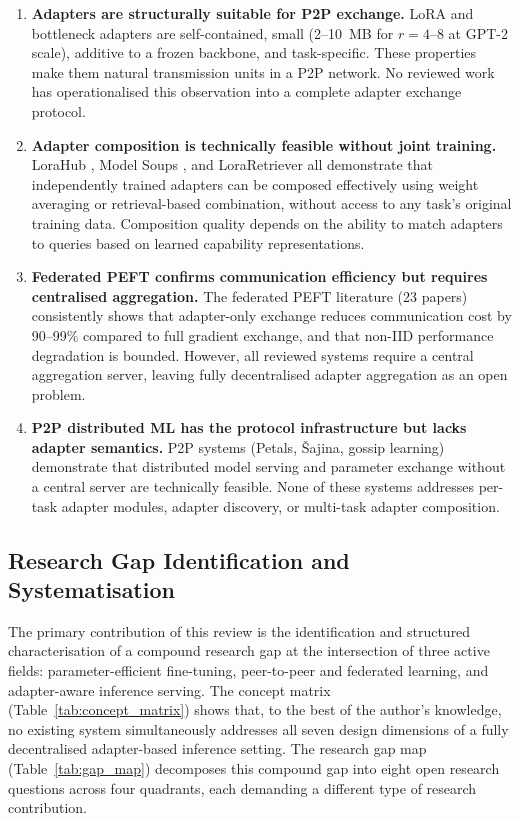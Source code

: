 \begin{enumerate}
  \item \textbf{Adapters are structurally suitable for P2P exchange.} LoRA and
    bottleneck adapters are self-contained, small (2--10~MB for $r = 4$--$8$ at
    GPT-2 scale), additive to a frozen backbone, and task-specific. These properties
    make them natural transmission units in a P2P network. No reviewed work has operationalised this observation into a complete adapter exchange protocol.

  \item \textbf{Adapter composition is technically feasible without joint training.}
    LoraHub \citep{Huang2023}, Model Soups \citep{Wortsman2022}, and
    LoraRetriever \citep{ZhaoLoraRetriever2024} all demonstrate that independently
    trained adapters can be composed effectively using weight averaging or retrieval-based
    combination, without access to any task's original training data. Composition quality
    depends on the ability to match adapters to queries based on learned capability
    representations.

  \item \textbf{Federated PEFT confirms communication efficiency but requires
    centralised aggregation.} The federated PEFT literature (23 papers) consistently
    shows that adapter-only exchange reduces communication cost by 90--99\% compared
    to full gradient exchange, and that non-IID performance degradation is bounded.
    However, all reviewed systems require a central aggregation server, leaving fully
    decentralised adapter aggregation as an open problem.

  \item \textbf{P2P distributed ML has the protocol infrastructure but lacks adapter
    semantics.} P2P systems (Petals, Šajina, gossip learning) demonstrate that
    distributed model serving and parameter exchange without a central server are
    technically feasible. None of these systems addresses per-task adapter modules,
    adapter discovery, or multi-task adapter composition.
\end{enumerate}

\subsection{Research Gap Identification and Systematisation}
\label{sec:conclusion:contributions}

The primary contribution of this review is the identification and structured
characterisation of a compound research gap at the intersection of three active
fields: parameter-efficient fine-tuning, peer-to-peer and federated learning,
and adapter-aware inference serving. The concept matrix (Table~\ref{tab:concept_matrix}) 
shows that, to the best of the author's knowledge, no existing system simultaneously addresses all seven design dimensions of a fully decentralised
adapter-based inference setting. The research gap map (Table~\ref{tab:gap_map})
decomposes this compound gap into eight open research questions across four
quadrants, each demanding a different type of research contribution.

